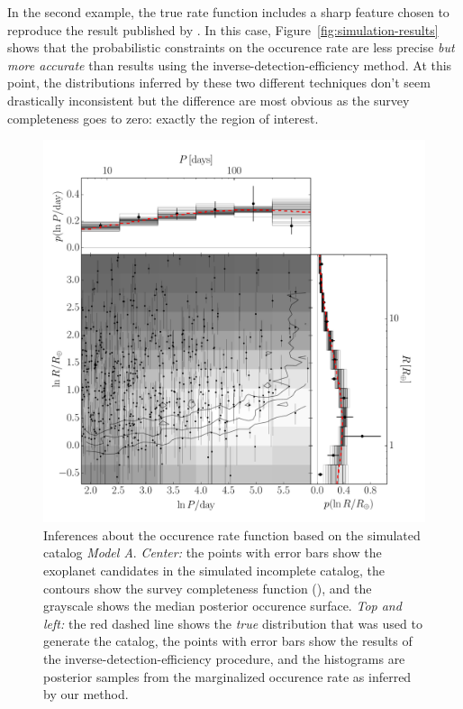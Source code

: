 \documentclass[12pt,preprint]{aastex}
\newcommand{\Fig}[1]{Figure~\ref{fig:#1}}
\newcommand{\fig}[1]{\Fig{#1}}
\newcommand{\figlabel}[1]{\label{fig:#1}}
\newcommand{\modela}{\emph{Model A}}
\begin{document}
In the second example, the true rate function includes a sharp feature chosen
to reproduce the result published by \citet{petigura}.
In this case, \fig{simulation-results} shows that the probabilistic
constraints on the occurence rate are less precise \emph{but more accurate}
than results using the inverse-detection-efficiency method.
At this point, the distributions inferred by these two different techniques
don't seem drastically inconsistent but the difference are most obvious as the
survey completeness goes to zero: exactly the region of interest.

\begin{figure}[p]
\begin{center}
\includegraphics[width=\textwidth]{figures/smooth/results.pdf}
\end{center}
\caption{%
Inferences about the occurence rate function based on the simulated catalog
\modela.
\emph{Center:} the points with error bars show the exoplanet candidates in the
simulated incomplete catalog, the contours show the survey completeness
function (\citealt{petigura}), and the grayscale shows the median posterior
occurence surface.
\emph{Top and left:} the red dashed line shows the \emph{true} distribution
that was used to generate the catalog, the points with error bars show the
results of the inverse-detection-efficiency procedure, and the histograms are
posterior samples from the marginalized occurence rate as inferred by our
method.
\figlabel{smooth-results}}
\end{figure}
\end{document}
